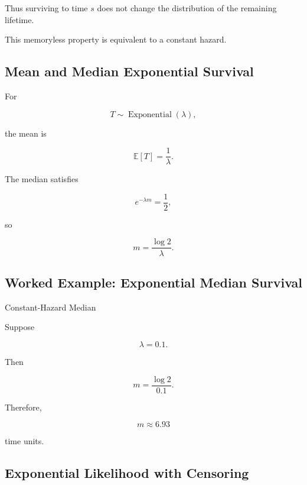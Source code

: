 Thus surviving to time \(s\) does not change the distribution of the
remaining lifetime.

This memoryless property is equivalent to a constant hazard.

\subsection{Mean and Median Exponential Survival}
\label{subsec:exponential-mean-median}

For

\[
T
\sim
\operatorname{Exponential}(\lambda),
\]

the mean is

\[
\boxed{
\mathbb{E}[T]
=
\frac1\lambda.
}
\]

The median satisfies

\[
e^{-\lambda m}
=
\frac12,
\]

so

\[
\boxed{
m
=
\frac{
\log2
}{
\lambda
}.
}
\]

\subsection{Worked Example: Exponential Median Survival}
\label{subsec:worked-exponential-median}

\begin{workedexamplebox}{Constant-Hazard Median}

Suppose

\[
\lambda=0.1.
\]

Then

\[
m
=
\frac{
\log2
}{
0.1
}.
\]

Therefore,

\begin{answerbox}
\[
\boxed{
m
\approx
6.93
}
\]

time units.
\end{answerbox}

\end{workedexamplebox}

\subsection{Exponential Likelihood with Censoring}
\label{subsec:exponential-censored-likelihood}

